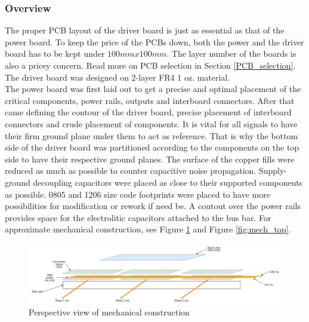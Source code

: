 \subsubsection{Overview}

The proper PCB layout of the driver board is just as essential as that of the power board. To keep the price of the PCBs down, both the power and the driver board has to be kept under $100mm x 100mm$. The layer number of the boards is also a pricey concern. Read more on PCB selection in Section \ref{PCB_selection}. The driver board was designed on 2-layer FR4 1 oz. material. \\

The power board was first laid out to get a precise and optimal placement of the critical components, power rails, outputs and interboard connectors. After that came defining the contour of the driver board, precise placement of interboard connectors and crude placement of components. It is vital for all signals to have their firm ground plane under them to act as reference. That is why the bottom side of the driver board was partitioned according to the components on the top side to have their respective ground planes. The surface of the copper fills were reduced as much as possible to counter capacitive noise propagation. Supply-ground decoupling capacitors were placed as close to their supported components as possible. 0805 and 1206 size code footprints were placed to have more possibilities for modification or rework if need be. A coutout over the power rails provides space for the electrolitic capacitors attached to the bus bar. For approximate mechanical construction, see Figure \ref{fig:mech_persp} and Figure \ref{fig:mech_top}.

\begin{figure}[H]
	\centering
	\includegraphics[width=1\textwidth]{pictures/hardware/Power_Board/mechanical_persp_new.png}
	\caption{Perspective view of mechanical construction}
	\label{fig:mech_persp}
\end{figure}


